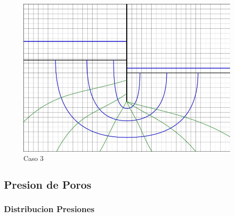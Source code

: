 \begin{figure}[H]
\begin{minipage}{0.32\textwidth}
        \includegraphics[width=\textwidth]{GRAFICOS/caso_3.jpg}
        \caption{Caso 3}
    \end{minipage}
  \end{figure}

\subsection{Presion de Poros}

\subsubsection{Distribucion Presiones}

